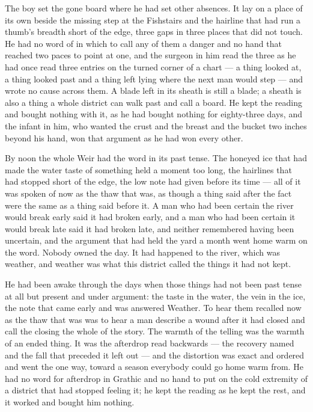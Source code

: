 The boy set the gone board where he had set other absences. It lay on a place of its own beside the missing step at the Fishstairs and the hairline that had run a thumb's breadth short of the edge, three gaps in three places that did not touch. He had no word of  in which to call any of them a danger and no hand that reached two paces to point at one, and the surgeon in him read the three as he had once read three entries on the turned corner of a chart --- a thing looked at, a thing looked past and a thing left lying where the next man would step --- and wrote no cause across them. A blade left in its sheath is still a blade; a sheath is also a thing a whole district can walk past and call a board. He kept the reading and bought nothing with it, as he had bought nothing for eighty-three days, and the infant in him, who wanted the crust and the breast and the bucket two inches beyond his hand, won that argument as he had won every other.

\scenebreak

By noon the whole Weir had the word in its past tense. The honeyed ice that had made the water taste of something held a moment too long, the hairlines that had stopped short of the edge, the low note  had given before its time --- all of it was spoken of now as the thaw that was, as though a thing said after the fact were the same as a thing said before it. A man who had been certain the river would break early said it had broken early, and a man who had been certain it would break late said it had broken late, and neither remembered having been uncertain, and the argument that had held the yard a month went home warm on the word. Nobody owned the day. It had happened to the river, which was weather, and weather was what this district called the things it had not kept.

He had been awake through the days when those things had not been past tense at all but present and under argument: the taste in the water, the vein in the ice, the note that came early and was answered Weather. To hear them recalled now as the thaw that was was to hear a man describe a wound after it had closed and call the closing the whole of the story. The warmth of the telling was the warmth of an ended thing. It was the afterdrop read backwards --- the recovery named and the fall that preceded it left out --- and the distortion was exact and ordered and went the one way, toward a season everybody could go home warm from. He had no word for afterdrop in Grathic and no hand to put on the cold extremity of a district that had stopped feeling it; he kept the reading as he kept the rest, and it worked and bought him nothing.

